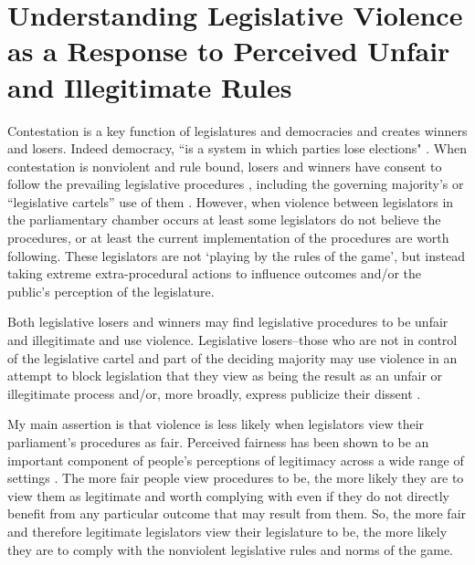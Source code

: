\documentclass[a4paper]{article}\usepackage{graphicx, color}
\begin{document}

\section{Understanding Legislative Violence as a Response to Perceived Unfair and Illegitimate Rules}

Contestation is a key function of legislatures and democracies \citep{Alvarez1996, Dahl1971, Follesdal2006} and creates winners and losers. Indeed democracy, ``is a system in which parties lose elections" \citep[][10]{Przeworski1991}. When contestation is nonviolent and rule bound, losers and winners have consent to follow the prevailing legislative procedures \citep[c.f.][]{Anderson2005}, including the governing majority's or ``legislative cartels'' use of them \citep{cox2007}. However, when violence between legislators in the parliamentary chamber occurs at least some legislators do not believe the procedures, or at least the current implementation of the procedures are worth following. These legislators are not `playing by the rules of the game', but instead taking extreme extra-procedural actions to influence outcomes and/or the public's perception of the legislature. 

Both legislative losers and winners may find legislative procedures to be unfair and illegitimate and use violence. Legislative losers--those who are not in control of the legislative cartel and part of the deciding majority may use violence in an attempt to block legislation that they view as being the result as an unfair or illegitimate process and/or, more broadly, express publicize their dissent \cite[]{Spary2013}.   

My main assertion is that violence is less likely when legislators view their parliament's procedures as fair. Perceived fairness has been shown to be an important component of people's perceptions of legitimacy across a wide range of settings \citep[see][]{thibaut1975,Tyler2001,Tyler2006}. The more fair people view procedures to be, the more likely they are to view them as legitimate and worth complying with even if they do not directly benefit from any particular outcome that may result from them. So, the more fair and therefore legitimate legislators view their legislature to be, the more likely they are to comply with the nonviolent legislative rules and norms of the game. 
\end{document}
